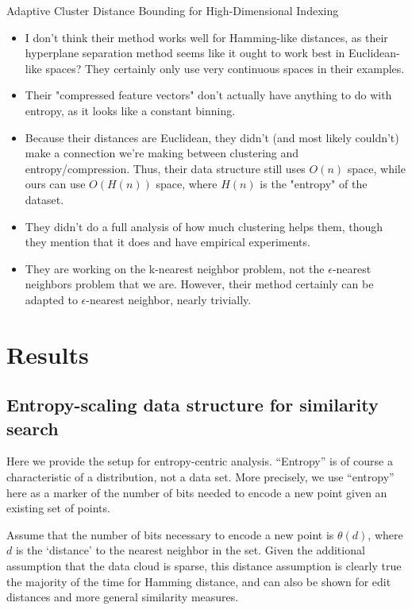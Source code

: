 \documentclass{amsbook}
\theoremstyle{definition}
\theoremstyle{remark}
\numberwithin{equation}{section}
\begin{document}
Adaptive Cluster Distance Bounding for High-Dimensional Indexing \cite{ramaswamy2011adaptive}
\begin{itemize}
\item I don't think their method works well for Hamming-like distances, as
   their hyperplane separation method seems like it ought to work best
   in Euclidean-like spaces? They certainly only use very continuous
   spaces in their examples.
\item Their "compressed feature vectors" don't actually have anything to do
   with entropy, as it looks like a constant binning.
\item Because their distances are Euclidean, they didn't (and most likely
   couldn't) make a connection we're making between clustering and
   entropy/compression. Thus, their data structure still uses $O(n)$
   space, while ours can use $O(H(n))$ space, where $H(n)$ is the "entropy"
   of the dataset.
\item They didn't do a full analysis of how much clustering helps them,
   though they mention that it does and have empirical experiments.
\item They are working on the k-nearest neighbor problem, not the
   $\epsilon$-nearest neighbors problem that we are. However, their method
   certainly can be adapted to $\epsilon$-nearest neighbor, nearly
   trivially.
\end{itemize}

\chapter{Results}
\section{Entropy-scaling data structure for similarity search}

Here we provide the setup for entropy-centric analysis.
``Entropy'' is of course a characteristic of a distribution, not a data set.
More precisely, we use ``entropy'' here as a marker of the number of bits needed to encode a new point given an existing set of points.


Assume that the number of bits necessary to encode a new point is $\theta(d)$, where $d$ is the ‘distance’ to the nearest neighbor in the set.
Given the additional assumption that the data cloud is sparse, this distance assumption is clearly true the majority of the time for Hamming distance, and can also be shown for edit distances and more general similarity measures.
\end{document}
